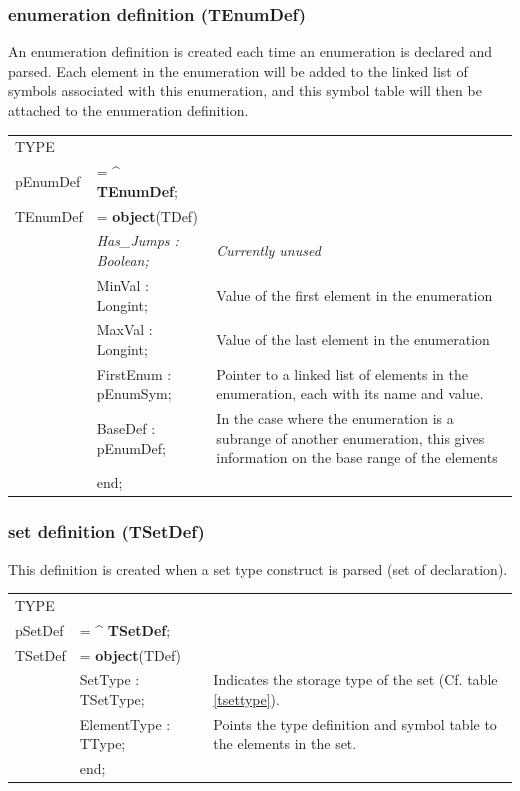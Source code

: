 \documentclass [a4paper,12pt]{article}
\begin{document}
\subsubsection{enumeration definition (TEnumDef)}
\label{subsubsec:mylabel9}

An enumeration definition is created each time an enumeration is declared
and parsed. Each element in the enumeration will be added to the linked list
of symbols associated with this enumeration, and this symbol table will then
be attached to the enumeration definition.

\begin{tabular*}{6,5in}{|l@{\extracolsep{\fill}}lp{}|}
\hline
\textsf{TYPE} & & \\
\xspace \textsf{pEnumDef} &= \^{} \textbf{TEnumDef};&  \\
\xspace \textsf{TEnumDef} &= \textbf{object}(TDef) & \\
&\textsf{\textit{Has{\_}Jumps : Boolean;}}&
    \textit{Currently unused} \\
&\textsf{MinVal : Longint;}&
    Value of the first element in the enumeration \\
&\textsf{MaxVal : Longint;}&
    Value of the last element in the enumeration \\
&\textsf{FirstEnum : pEnumSym;}&
    Pointer to a linked list of elements in the enumeration, each with
    its name and value. \\
&\textsf{BaseDef : pEnumDef;}&
    In the case where the enumeration is a subrange of another enumeration,
    this gives information on the base range of the elements \\
&\textsf{end;}&  \\
\hline
\end{tabular*}

\subsubsection{set definition (TSetDef)}
\label{subsubsec:mylabel10}

This definition is created when a set type construct is parsed (\textsf{set
of declaration}).

\begin{tabular*}{6.5in}{|l@{\extracolsep{\fill}}lp{}|}
\hline
\textsf{TYPE} & & \\
\xspace \textsf{pSetDef} &= \^{} \textbf{TSetDef};&  \\
\xspace \textsf{TSetDef} &= \textbf{object}(TDef) & \\
&\textsf{SetType : TSetType;}&
    Indicates the storage type of the set (Cf. table \ref{tsettype}). \\
&\textsf{ElementType : TType;}&
    Points the type definition and symbol table to the elements in the set. \\
&\textsf{end;}&  \\
\hline
\end{tabular*}
\end{document}
